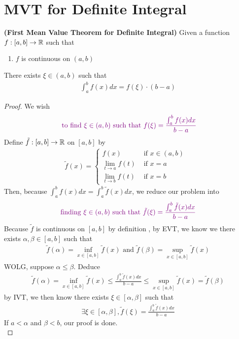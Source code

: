 \documentclass{report}
\begin{document}
\section{MVT for Definite Integral}
\begin{theorem}
\textbf{(First Mean Value Theorem for Definite Integral)} Given a function $f:[a,b]\rightarrow \mathbb{R}$ such that 
\begin{enumerate}[label=(\alph*)]
  \item $f$ is continuous on $(a,b)$
\end{enumerate}
There exists $\xi \in (a,b)$ such that 
\begin{align*}
\int_a^b f(x)dx = f(\xi)\cdot (b-a)
\end{align*}
\end{theorem}
\begin{proof}
We wish 
\begin{align*}
\textcolor{violet}{\text{ to find  }\xi \in (a,b)\text{ such that }f(\xi)=\frac{\int_a^b f(x)dx}{b-a}}
\end{align*}
Define $\tilde{f}:[a,b]\rightarrow \mathbb{R}$ on $[a,b]$ by 
\begin{align}
\label{M1}
\tilde{f}(x)=\begin{cases}
  f(x)& \text{ if $x \in (a,b)$ }\\
  \lim_{t\to a}f(t)& \text{ if $x=a$ }\\
  \lim_{t\to b}f(t)& \text{ if $x=b$ }
\end{cases}
\end{align}
Then, because $\int_a^b f(x)dx=\int_a^b \tilde{f}(x)dx $, we reduce our problem into  
\begin{align*}
\textcolor{violet}{\text{ finding $\xi\in(a,b)$ such that $\tilde{f} (\xi)= \frac{\int_a^b \tilde{f}(x)dx }{b-a}$ }}
\end{align*}
Because $\tilde{f} $ is continuous on $[a,b]$ by definition , by EVT, we know we there exists $\alpha,\beta  \in [a,b]$ such that 
\begin{align}
\label{M4}
\tilde{f} (\alpha )=\inf_{x \in [a,b]}\tilde{f}(x)\text{ and } \tilde{f}(\beta ) =\sup_{x \in[a,b]}\tilde{f}(x) 
\end{align}
WOLG, suppose $\alpha \leq \beta $. Deduce 
\begin{align*}
\tilde{f}(\alpha )= \inf_{x \in [a,b]}\tilde{f}(x)\leq \frac{\int_a^b \tilde{f}(x)dx }{b-a} \leq \sup_{x \in [a,b]}\tilde{f}(x) =\tilde{f}(\beta ) 
\end{align*}
by IVT, we then know there exists $\xi\in [\alpha ,\beta ]$ such that 
\begin{align}
\label{M3}
\exists \xi\in [\alpha ,\beta ], \tilde{f}(\xi)=\frac{\int_a^b \tilde{f}(x)dx }{b-a} 
\end{align}
If $a<\alpha $ and $\beta <b$, our proof is done.\\



\end{proof}
\end{document}
